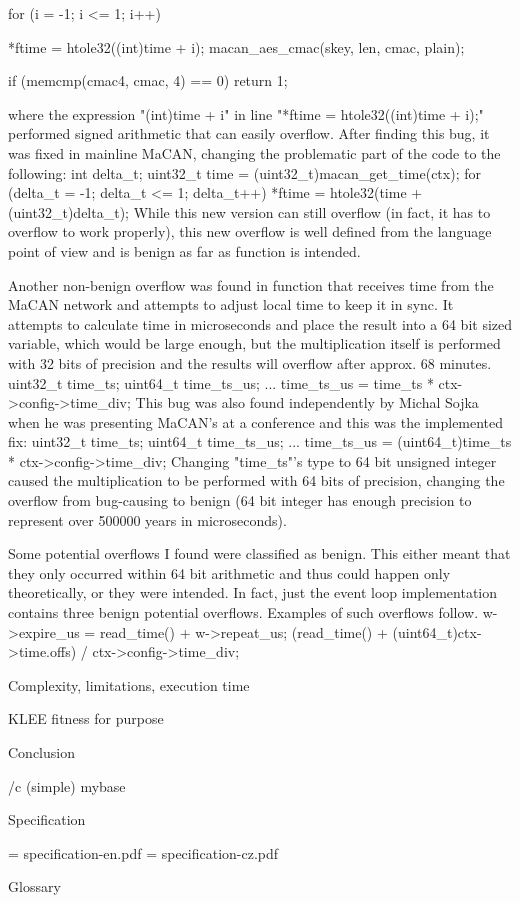 for (i = -1; i <= 1; i++) {
    *ftime = htole32((int)time + i);
    macan_aes_cmac(skey, len, cmac, plain);

    if (memcmp(cmac4, cmac, 4) == 0) {
        return 1;
    }
}
\endtt
where the expression "(int)time + i" in line "*ftime = htole32((int)time + i);"
performed signed arithmetic that can easily overflow. After finding this bug,
it was fixed in mainline MaCAN, changing the problematic part of the code to
the following:
\begtt
int delta_t;
uint32_t time = (uint32_t)macan_get_time(ctx);
for (delta_t = -1; delta_t <= 1; delta_t++) {
    *ftime = htole32(time + (uint32_t)delta_t);
}
\endtt
While this new version can still overflow (in fact, it has to overflow to work
properly), this new overflow is well defined from the language point of view
and is benign as far as function is intended.

Another non-benign overflow was found in function that receives time from the
MaCAN network and attempts to adjust local time to keep it in sync. It attempts
to calculate time in microseconds and place the result into a 64 bit sized
variable, which would be large enough, but the multiplication itself is
performed with 32 bits of precision and the results will overflow after approx.
68 minutes.
\begtt
uint32_t time_ts;
uint64_t time_ts_us;
...
time_ts_us = time_ts * ctx->config->time_div;
\endtt
This bug was also found independently by Michal Sojka when he was presenting
MaCAN's at a conference and this was the implemented fix:
\begtt
uint32_t time_ts;
uint64_t time_ts_us;
...
time_ts_us = (uint64_t)time_ts * ctx->config->time_div;
\endtt
Changing "time_ts"'s type to 64 bit unsigned integer caused the multiplication
to be performed with 64 bits of precision, changing the overflow from
bug-causing to benign (64 bit integer has enough precision to represent over
500000 years in microseconds).

Some potential overflows I found were classified as benign. This either meant
that they only occurred within 64 bit arithmetic and thus could happen only
theoretically, or they were intended. In fact, just the event loop
implementation contains three benign potential overflows. Examples of such
overflows follow.
\begtt
w->expire_us = read_time() + w->repeat_us;
\endtt
\begtt
(read_time() + (uint64_t)ctx->time.offs) / ctx->config->time_div;
\endtt

\sec Complexity, limitations, execution time

\sec KLEE fitness for purpose

\chap Conclusion



\bibchap
\usebib/c (simple) mybase


\app Specification

\picw=\hsize
\cinspic specification-en.pdf
\vfil\break
\picw=\hsize
\cinspic specification-cz.pdf
\nextoddpage


\app Glossary\par
\makeglos

\nextoddpage

\bye

